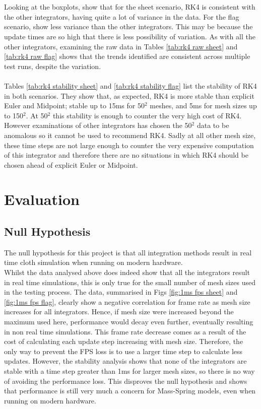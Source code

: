 \\\\Looking at the boxplots,  show that for the sheet scenario, RK4 is consistent with the other integrators, having quite a lot of variance in the data. For the flag scenario,  show less variance than the other integrators. This may be because the update times are so high that there is less possibility of variation. As with all the other integrators, examining the raw data in Tables \ref{tab:rk4 raw sheet} and \ref{tab:rk4 raw flag} shows that the trends identified are consistent across multiple test runs, despite the variation.
\\\\Tables \ref{tab:rk4 stability sheet} and \ref{tab:rk4 stability flag} list the stability of RK4 in both scenarios. They show that, as expected, RK4 is more stable than explicit Euler and Midpoint; stable up to 15ms for 50$^{2}$ meshes, and 5ms for mesh sizes up to 150$^{2}$. At 50$^{2}$ this stability is enough to counter the very high cost of RK4. However examinations of other integrators has chosen the 50$^{2}$ data to be anomalous so it cannot be used to recommend RK4. Sadly at all other mesh size, these time steps are not large enough to counter the very expensive computation of this integrator and therefore there are no situations in which RK4 should be chosen ahead of explicit Euler or Midpoint.

\section{Evaluation}

\subsection{Null Hypothesis}
The null hypothesis for this project is that all integration methods result in real time cloth simulation when running on modern hardware.
\\Whilst the data analysed above does indeed show that all the integrators result in real time simulations, this is only true for the small number of mesh sizes used in the testing process. The data, summarised in Figs \ref{fig:1ms fps sheet} and \ref{fig:1ms fps flag}, clearly show a negative correlation for frame rate as mesh size increases for all integrators. Hence, if mesh size were increased beyond the maximum used here, performance would decay even further, eventually resulting in non real time simulations. This frame rate decrease comes as a result of the cost of calculating each update step increasing with mesh size. Therefore, the only way to prevent the FPS loss is to use a larger time step to calculate less updates. However, the stability analysis shows that none of the integrators are stable with a time step greater than 1ms for larger mesh sizes, so there is no way of avoiding the performance loss. This disproves the null hypothesis and shows that performance is still very much a concern for Mass-Spring models, even when running on modern hardware.

